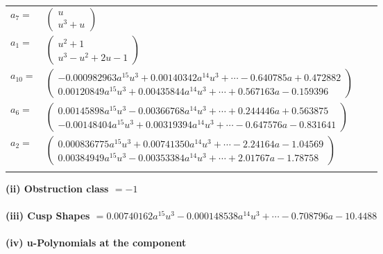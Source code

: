 \documentclass[1p]{elsarticle_modified}
\theoremstyle{definition}
\begin{document}
\begin{tabular}{m{7pt} m{180pt} m{7pt} m{180pt} }
\flushright $a_{7}=$&$\begin{pmatrix}u\\u^3+u\end{pmatrix}$ \\
\flushright $a_{1}=$&$\begin{pmatrix}u^2+1\\u^3- u^2+2 u-1\end{pmatrix}$ \\
\flushright $a_{10}=$&$\begin{pmatrix}-0.000982963 a^{15} u^{3}+0.00140342 a^{14} u^{3}+\cdots-0.640785 a+0.472882\\0.00120849 a^{15} u^{3}+0.00435844 a^{14} u^{3}+\cdots+0.567163 a-0.159396\end{pmatrix}$ \\
\flushright $a_{6}=$&$\begin{pmatrix}0.00145898 a^{15} u^{3}-0.00366768 a^{14} u^{3}+\cdots+0.244446 a+0.563875\\-0.00148404 a^{15} u^{3}+0.00319394 a^{14} u^{3}+\cdots-0.647576 a-0.831641\end{pmatrix}$ \\
\flushright $a_{2}=$&$\begin{pmatrix}0.000836775 a^{15} u^{3}+0.00741350 a^{14} u^{3}+\cdots-2.24164 a-1.04569\\0.00384949 a^{15} u^{3}-0.00353384 a^{14} u^{3}+\cdots+2.01767 a-1.78758\end{pmatrix}$\\&\end{tabular}
\flushleft \textbf{(ii) Obstruction class $= -1$}\\~\\
\flushleft \textbf{(iii) Cusp Shapes $= 0.00740162 a^{15} u^{3}-0.000148538 a^{14} u^{3}+\cdots-0.708796 a-10.4488$}\\~\\
\newpage\renewcommand{\arraystretch}{1}
\flushleft \textbf{(iv) u-Polynomials at the component}\newline \\
\end{document}
